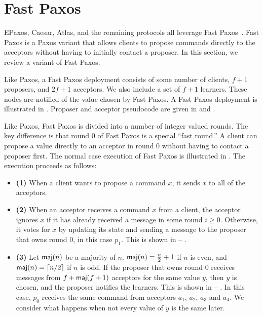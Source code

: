 \section{Fast Paxos}
{}
{}

{}

EPaxos, Caesar, Atlas, and the remaining \BPaxos{} protocols all leverage Fast
Paxos~\cite{lamport2006fast}. Fast Paxos is a Paxos variant that allows clients
to propose commands directly to the acceptors without having to initially
contact a proposer. In this section, we review a variant of Fast Paxos.

Like Paxos, a Fast Paxos deployment consists of some number of clients, $f+1$
proposers, and $2f+1$ acceptors. We also include a set of $f+1$ learners. These
nodes are notified of the value chosen by Fast Paxos. A Fast Paxos deployment
is illustrated in . Proposer and acceptor pseudocode
are given in  and .

Like Paxos, Fast Paxos is divided into a number of integer valued rounds.  The
key difference is that round 0 of Fast Paxos is a special ``fast round.'' A
client can propose a value directly to an acceptor in round 0 without having to
contact a proposer first. The normal case execution of Fast Paxos is
illustrated in . The execution proceeds as follows:

\begin{itemize}
  \item \textbf{(1)}
    When a client wants to propose a command $x$, it sends $x$ to all of the
    acceptors.

  \item \textbf{(2)}
    When an acceptor receives a command $x$ from a client, the acceptor ignores
    $x$ if it has already received a message in some round $i \geq 0$.
    Otherwise, it votes for $x$ by updating its state and sending a
     message to the proposer that owns round $0$, in this
    case $p_1$. This is shown in 
     -- .

  \item \textbf{(3)}
    Let $\textsf{maj}(n)$ be a majority of $n$. $\textsf{maj}(n) = \frac{n}{2} + 1$ if $n$ is
    even, and $\textsf{maj}(n) = \lceil n/2\rceil$ if $n$ is odd. If the proposer that owns
    round $0$ receives  messages from $f + \textsf{maj}(f+1)$
    acceptors for the same value $y$, then $y$ is chosen, and the proposer
    notifies the learners. This is shown in 
     -- . In this case, $p_0$ receives
    the same command from acceptors $a_1$, $a_2$, $a_3$ and $a_4$. We consider
    what happens when not every value of $y$ is the same later.
\end{itemize}

